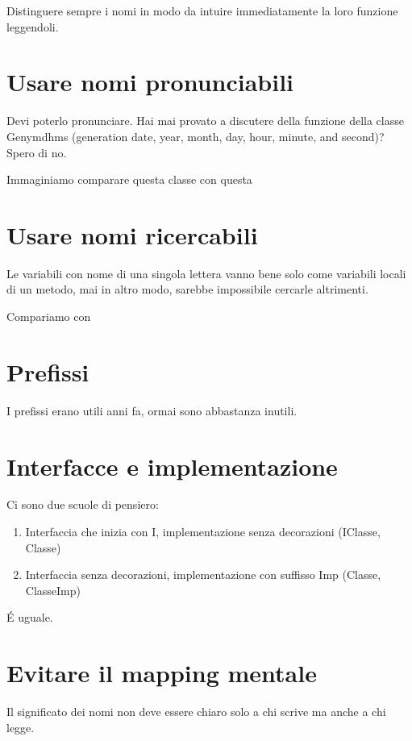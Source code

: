 \documentclass[11pt,a4paper]{book}
\begin{document}
Distinguere sempre i nomi in modo da intuire immediatamente la loro funzione leggendoli.

\section{Usare nomi pronunciabili}
Devi poterlo pronunciare. Hai mai provato a discutere della funzione della classe Genymdhms (generation date, year, month, day, hour, minute, and second)? Spero di no.

Immaginiamo comparare questa classe
\label{code: 008}
con questa
\label{code: 009}

\section{Usare nomi ricercabili}
Le variabili con nome di una singola lettera vanno bene solo come variabili locali di un metodo, mai in altro modo, sarebbe impossibile cercarle altrimenti.

Compariamo
\label{code: 010}
con
\label{code: 011}

\section{Prefissi}
I prefissi erano utili anni fa, ormai sono abbastanza inutili.

\section{Interfacce e implementazione}
Ci sono due scuole di pensiero:
\begin{enumerate}
	\item Interfaccia che inizia con I, implementazione senza decorazioni (IClasse, Classe)
	\item Interfaccia senza decorazioni, implementazione con suffisso Imp (Classe, ClasseImp)
\end{enumerate}

É uguale.

\section{Evitare il mapping mentale}
Il significato dei nomi non deve essere chiaro solo a chi scrive ma anche a chi legge.
\end{document}
